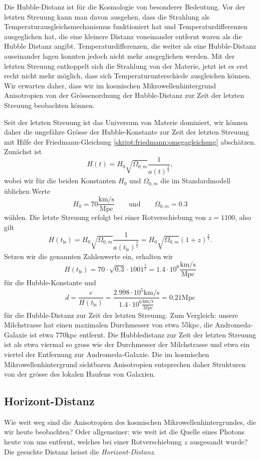 Die Hubble-Distanz ist für die Kosmologie von besonderer Bedeutung.
Vor der letzten Streuung kann man davon ausgehen, dass die Strahlung
als Temperaturausgleichsmechanismus funktioniert hat und Temperaturdifferenzen
ausgeglichen hat,
die eine kleinere Distanz voneinander entfernt waren als die Hubble Distanz
angibt.
Temperaturdifferenzen, die weiter als eine Hubble-Distanz auseinander lagen
konnten jedoch nicht mehr ausgeglichen werden.
Mit der letzten Streuung entkoppelt sich die Strahlung von der Materie,
jetzt ist es erst recht nicht mehr möglich, dass sich Temperaturunterschiede
ausgleichen können.
Wir erwarten daher, dass wir im kosmischen Mikrowellenhintergrund
Anisotropien von der Grössenordnung der Hubble-Distanz zur Zeit der
letzten Streuung beobachten können.

Seit der letzten Streuung ist das Universum von Materie dominiert,
wir können daher die ungefähre Grösse der Hubble-Konstante zur
Zeit der letzten Streuung mit Hilfe der
Friedmann-Gleichung \eqref{skript:friedmann:omegagleichung}
abschätzen.
Zunächst ist
\[
H(t) = H_0\sqrt{\Omega_{0,m}}\frac{1}{a(t)^\frac32},
\]
wobei wir für die beiden Konstanten $H_0$ und $\Omega_{0,m}$ die
im Standardmodell üblichen Werte
\[
H_0
=
70 \frac{\text{km/s}}{\text{Mpc}}
\qquad\text{und}\qquad
\Omega_{0,m}=0.3
\]
wählen.
Die letzte Streuung erfolgt bei einer Rotverschiebung von $z=1100$, also
gilt
\[
H(t_{\text{ls}})
=
H_0\sqrt{\Omega_{0,m}}\frac{1}{a(t_{\text{ls}})^\frac32}
=
H_0\sqrt{\Omega_{0,m}}(1+z)^\frac32.
\]
Setzen wir die genannten Zahlenwerte ein, erhalten wir
\[
H(t_{\text{ls}})
=
70\cdot \sqrt{0.3}\cdot 1001^\frac32
=
1.4\cdot 10^{6}\frac{\text{km/s}}{\text{Mpc}}
\]
für die Hubble-Konstante und 
\[
d
=
\frac{c}{H(t_{\text{ls}})}
=
\frac{2.998\cdot 10^{5}\text{km/s}}%
{1.4\cdot 10^{6}\frac{\text{km/s}}{\text{Mpc}}}
=
0.21\text{Mpc}
\]
für die Hubble-Distanz zur Zeit der letzten Streuung.
Zum Vergleich: unsere Milchstrasse hat einen maximalen Durchmesser
von etwa 55kpc, die Andromeda-Galaxie ist etwa 770kpc entfernt.
Die Hubbledistanz zur Zeit der letzten Streuung ist als etwa viermal
so gross wie der Durchmesser der Milchstrasse und etwa ein viertel der
Entfernung zur Andromeda-Galaxie.
Die im kosmischen Mikrowellenhintergrund sichtbaren Anisotropien
entsprechen daher Strukturen von der grösse des lokalen Haufens von
Galaxien.

\subsection{Horizont-Distanz}
Wie weit weg sind die Anisotropien des kosmischen Mikrowellenhintergrundes,
die wir heute beobachten?
Oder allgemeiner: wie weit ist die Quelle eines Photons heute von uns
entfernt, welches bei einer Rotverschiebung $z$ ausgesandt wurde?
Die gesuchte Distanz heisst die {\em Horizont-Distanz}.

